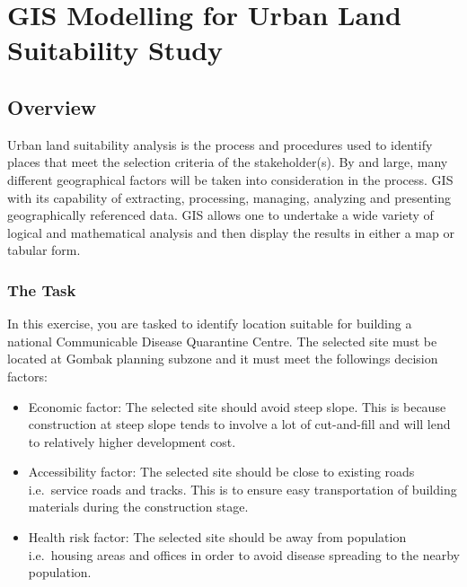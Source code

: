 \documentclass[
  letterpaper,
  DIV=11,
  numbers=noendperiod]{scrreprt}
\providecommand{\tightlist}{%
  \setlength{\itemsep}{0pt}\setlength{\parskip}{0pt}}\usepackage{longtable,booktabs,array}
\begin{document}

\hypertarget{gis-modelling-for-urban-land-suitability-study}{%
\chapter{GIS Modelling for Urban Land Suitability
Study}\label{gis-modelling-for-urban-land-suitability-study}}

\hypertarget{overview}{%
\section{Overview}\label{overview}}

Urban land suitability analysis is the process and procedures used to
identify places that meet the selection criteria of the stakeholder(s).
By and large, many different geographical factors will be taken into
consideration in the process. GIS with its capability of extracting,
processing, managing, analyzing and presenting geographically referenced
data. GIS allows one to undertake a wide variety of logical and
mathematical analysis and then display the results in either a map or
tabular form.

\hypertarget{the-task-1}{%
\subsection{The Task}\label{the-task-1}}

In this exercise, you are tasked to identify location suitable for
building a national Communicable Disease Quarantine Centre. The selected
site must be located at Gombak planning subzone and it must meet the
followings decision factors:

\begin{itemize}
\tightlist
\item
  Economic factor: The selected site should avoid steep slope. This is
  because construction at steep slope tends to involve a lot of
  cut-and-fill and will lend to relatively higher development cost.
\item
  Accessibility factor: The selected site should be close to existing
  roads i.e.~service roads and tracks. This is to ensure easy
  transportation of building materials during the construction stage.
\item
  Health risk factor: The selected site should be away from population
  i.e.~housing areas and offices in order to avoid disease spreading to
  the nearby population.
\end{itemize}
\end{document}
